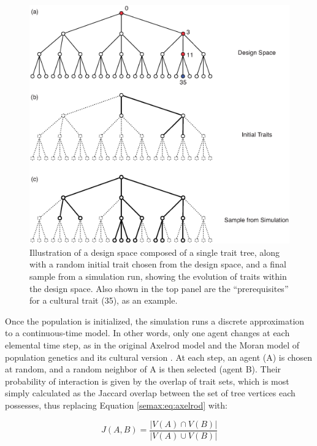 \begin{figure}[htbp] 
\centering 
\includegraphics[scale=0.5]{graphics/semanticaxelrod/design-init-final.eps} 
\caption{Illustration of a design space composed of a single trait tree, along with a random initial trait chosen from the design space, and a final sample from a simulation run, showing the evolution of traits within the design space.  Also shown in the top panel are the ``prerequisites'' for a cultural trait (35), as an example.} 
\label{semax:img:prereq} 
\end{figure}

Once the population is initialized, the simulation runs a discrete
approximation to a continuous-time model. In other words, only one agent
changes at each elemental time step, as in the original Axelrod model
and the Moran model of population genetics and its cultural version
\citep{aoki2011rates, moran1962statistical, moran1958random}. At each
step, an agent (A) is chosen at random, and a random neighbor of A is
then selected (agent B). Their probability of interaction is given by
the overlap of trait sets, which is most simply calculated as the
Jaccard overlap between the set of tree vertices each possesses, thus
replacing Equation \ref{semax:eq:axelrod} with:

\begin{equation}J(A,B) = \frac{|V(A) \cap V(B)|}{|V(A) \cup V(B)|}\end{equation}

